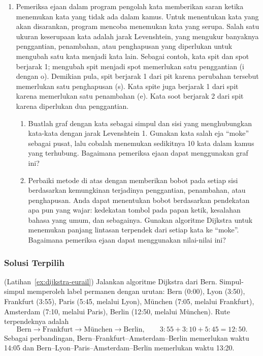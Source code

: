 \begin{enumerate}[start=18]
\item	Pemeriksa ejaan dalam program pengolah kata memberikan saran ketika menemukan kata yang tidak ada dalam kamus.  Untuk menentukan kata yang akan disarankan, program mencoba menemukan kata yang serupa.  Salah satu ukuran keserupaan kata adalah jarak Levenshtein, yang mengukur banyaknya penggantian, penambahan, atau penghapusan yang diperlukan untuk mengubah satu kata menjadi kata lain.   Sebagai contoh, kata spit dan spot berjarak 1; mengubah spit menjadi spot memerlukan satu penggantian (i dengan o).   Demikian pula, spit berjarak 1 dari pit karena perubahan tersebut memerlukan satu penghapusan (s).  Kata spite juga berjarak 1 dari spit karena memerlukan satu penambahan (e).  Kata soot berjarak 2 dari spit karena diperlukan dua penggantian.
\begin{enumerate}
\item	Buatlah graf dengan kata sebagai simpul dan sisi yang menghubungkan kata-kata dengan jarak Levenshtein 1.  Gunakan kata salah eja “moke” sebagai pusat, lalu cobalah menemukan sedikitnya 10 kata dalam kamus yang terhubung.  Bagaimana pemeriksa ejaan dapat menggunakan graf ini?   
\item	Perbaiki metode di atas dengan memberikan bobot pada setiap sisi berdasarkan kemungkinan terjadinya penggantian, penambahan, atau penghapusan.  Anda dapat menentukan bobot berdasarkan pendekatan apa pun yang wajar: kedekatan tombol pada papan ketik, kesalahan bahasa yang umum, dan sebagainya.  Gunakan algoritme Dijkstra untuk menemukan panjang lintasan terpendek dari setiap kata ke “moke”.  Bagaimana pemeriksa ejaan dapat menggunakan nilai-nilai ini?   \\
\end{enumerate}

\end{enumerate}

\subsubsection*{Solusi Terpilih}

\begin{solution}(Latihan~\ref{ex:dijkstra-eurail})
Jalankan algoritme Dijkstra dari Bern.  Simpul-simpul memperoleh label permanen dengan urutan: Bern (0:00), Lyon (3:50), Frankfurt (3:55), Paris (5:45, melalui Lyon), M\"unchen (7:05, melalui Frankfurt), Amsterdam (7:10, melalui Paris), Berlin (12:50, melalui M\"unchen).  Rute terpendeknya adalah
\[
\text{Bern} \to \text{Frankfurt} \to \text{M\"unchen} \to \text{Berlin},
\qquad 3{:}55 + 3{:}10 + 5{:}45 = 12{:}50.
\]
Sebagai perbandingan, Bern--Frankfurt--Amsterdam--Berlin memerlukan waktu 14:05 dan Bern--Lyon--Paris--Amsterdam--Berlin memerlukan waktu 13:20.
\end{solution}

